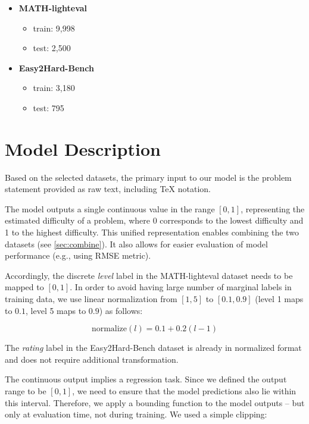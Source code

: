 \documentclass[runningheads]{llncs}
\begin{document}
\begin{itemize}

    \item \textbf{MATH-lighteval}
    \begin{itemize}
        \item train: 9{,}998
        \item test: 2{,}500
    \end{itemize}

\vspace{10pt}

    \item \textbf{Easy2Hard-Bench}
    \begin{itemize}
        \item train: 3{,}180
        \item test: 795
    \end{itemize}

\end{itemize}


\section{Model Description}
\label{sec:model}

Based on the selected datasets, the primary input to our model is the problem statement provided as raw text, including \TeX{} notation.

The model outputs a single continuous value in the range $[0,1]$, representing the estimated difficulty of a problem, where 0 corresponds to the lowest difficulty and 1 to the highest difficulty. This unified representation enables combining the two datasets (see \cref{sec:combine}). It also allows for easier evaluation of model performance (e.g., using RMSE metric).

Accordingly, the discrete \textit{level} label in the MATH-lighteval dataset needs to be mapped to $[0,1]$. In order to avoid having large number of marginal labels in training data, we use linear normalization from $[1,5]$ to $[0.1,0.9]$ (level 1 maps to $0.1$, level 5 maps to $0.9$) as follows:

$$ \text{normalize}(l) = 0.1 + 0.2(l - 1) $$

The \textit{rating} label in the Easy2Hard-Bench dataset is already in normalized format and does not require additional transformation.

The continuous output implies a regression task. Since we defined the output range to be $[0,1]$, we need to ensure that the model predictions also lie within this interval. Therefore, we apply a bounding function to the model outputs -- but only at evaluation time, not during training. We used a simple clipping:
\end{document}
